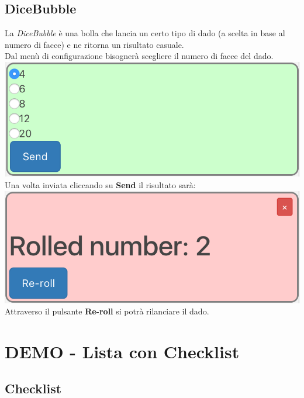 \subsection{DiceBubble}
La \textit{DiceBubble} è una bolla che lancia un certo tipo di dado (a scelta in base al numero di facce) e ne ritorna un risultato casuale.\\
Dal menù di configurazione bisognerà scegliere il numero di facce del dado.\\

\includegraphics[scale=0.75]{img/randConfig.png}
\\
Una volta inviata cliccando su \textbf{Send} il risultato sarà:\\

\includegraphics[scale=0.75]{img/rand.png}
\\
Attraverso il pulsante \textbf{Re-roll} si potrà rilanciare il dado.

\newpage

\section{DEMO - Lista con Checklist}

\subsection{Checklist}

